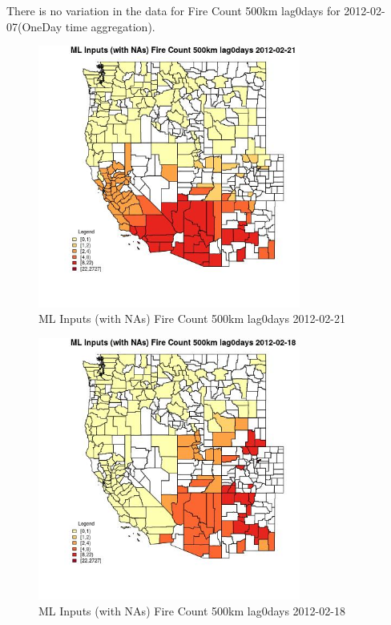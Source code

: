 There is no variation in the data for Fire Count 500km lag0days for 2012-02-07(OneDay time aggregation). 
 

\begin{figure} 
\centering  
\includegraphics[width=0.77\textwidth]{Code_Outputs/Report_ML_input_PM25_Step4_part_f_de_duplicated_aveswNAs_CountyFire_Count_500km_lag0daysMean2012-02-21.jpg} 
\caption{\label{fig:Report_ML_input_PM25_Step4_part_f_de_duplicated_aveswNAsCountyFire_Count_500km_lag0daysMean2012-02-21}ML Inputs (with NAs) Fire Count 500km lag0days 2012-02-21} 
\end{figure} 
 

\clearpage 

\begin{figure} 
\centering  
\includegraphics[width=0.77\textwidth]{Code_Outputs/Report_ML_input_PM25_Step4_part_f_de_duplicated_aveswNAs_CountyFire_Count_500km_lag0daysMean2012-02-18.jpg} 
\caption{\label{fig:Report_ML_input_PM25_Step4_part_f_de_duplicated_aveswNAsCountyFire_Count_500km_lag0daysMean2012-02-18}ML Inputs (with NAs) Fire Count 500km lag0days 2012-02-18} 
\end{figure} 
 

